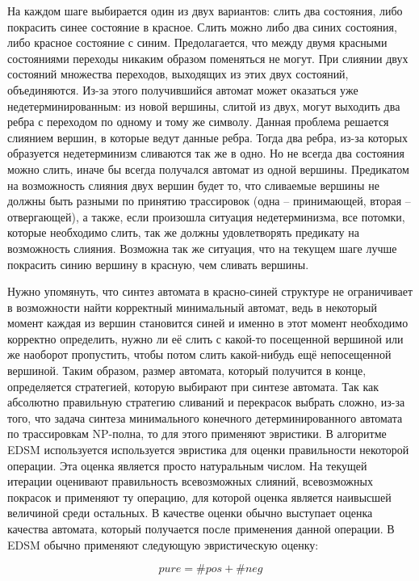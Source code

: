 \documentclass[times,specification,annotation]{itmo-student-thesis}
\begin{document}
На каждом шаге выбирается один из двух вариантов: слить два состояния, либо покрасить синее состояние в красное. Слить можно либо два синих состояния,
либо красное состояние с синим. Предолагается, что между двумя красными состояниями переходы никаким образом поменяться не могут. При слиянии двух состояний 
множества переходов, выходящих из этих двух состояний, объединяются. Из-за этого получившийся автомат может оказаться уже недетерминированным: из новой вершины,
слитой из двух, могут выходить два ребра с переходом по одному и тому же символу. Данная проблема решается слиянием вершин, в которые ведут данные ребра. Тогда
два ребра, из-за которых образуется недетерминизм сливаются так же в одно. Но не всегда два состояния можно слить, иначе бы всегда получался автомат из одной вершины.
Предикатом на возможность слияния двух вершин будет то, что сливаемые вершины не должны быть разными по принятию трассировок (одна -- принимающей, вторая -- отвергающей), а также, 
если произошла ситуация недетерминизма, все потомки, которые необходимо слить, так же должны удовлетворять предикату на возможность слияния.
Возможна так же ситуация, что на текущем шаге лучше покрасить синию вершину в красную, чем сливать вершины.

Нужно упомянуть, что синтез автомата в красно-синей структуре не ограничивает в возможности найти корректный минимальный автомат, ведь в некоторый момент каждая из вершин становится
синей и именно в этот момент необходимо корректно определить, нужно ли её слить с какой-то посещенной вершиной или же наоборот пропустить, чтобы потом слить какой-нибудь
ещё непосещенной вершиной. Таким образом, размер автомата, который получится в конце, определяется стратегией, которую выбирают при синтезе автомата.
Так как абсолютно правильную стратегию сливаний и перекрасок выбрать сложно, из-за того, что задача синтеза минимального конечного детерминированного автомата по трассировкам 
NP-полна, то для этого применяют эвристики. В алгоритме EDSM используется используется эвристика для оценки правильности некоторой операции. Эта оценка является просто натуральным
числом. На текущей итерации оценивают правильность всевозможных слияний, всевозможных покрасок и применяют ту операцию, для которой оценка является наивысшей величиной среди остальных.
В качестве оценки обычно выступает оценка качества автомата, который получается после применения данной операции.
В EDSM обычно применяют следующую эвристическую оценку:

\begin{equation}
  pure = \#pos + \#neg
  \label{heur_1}
\end{equation}
\end{document}
